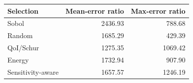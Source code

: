 \begin{tabular}{lrr}
\toprule
Selection & Mean-error ratio & Max-error ratio \\
\midrule
Sobol & 2436.93 & 788.68 \\
Random & 1685.29 & 429.39 \\
QoI/Schur & 1275.35 & 1069.42 \\
Energy & 1732.94 & 907.90 \\
Sensitivity-aware & 1657.57 & 1246.19 \\
\bottomrule
\end{tabular}
